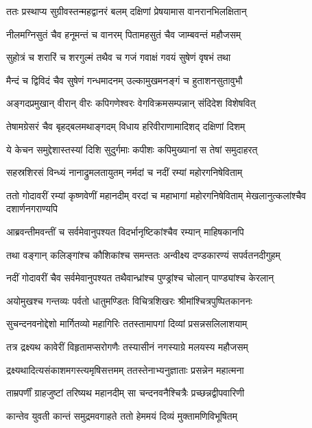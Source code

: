 
\twolineshloka
{ततः प्रस्थाप्य सुग्रीवस्तन्महद्वानरं बलम्}
{दक्षिणां प्रेषयामास वानरानभिलक्षितान्} %

\twolineshloka
{नीलमग्निसुतं चैव हनूमन्तं च वानरम्}
{पितामहसुतं चैव जाम्बवन्तं महौजसम्} %

\twolineshloka
{सुहोत्रं च शरारिं च शरगुल्मं तथैव च}
{गजं गवाक्षं गवयं सुषेणं वृषभं तथा} %

\twolineshloka
{मैन्दं च द्विविदं चैव सुषेणं गन्धमादनम्}
{उल्कामुखमनङ्गं च हुताशनसुतावुभौ} %

\twolineshloka
{अङ्गदप्रमुखान् वीरान् वीरः कपिगणेश्वरः}
{वेगविक्रमसम्पन्नान् संदिदेश विशेषवित्} %

\twolineshloka
{तेषामग्रेसरं चैव बृहद्बलमथाङ्गदम्}
{विधाय हरिवीराणामादिशद् दक्षिणां दिशम्} %

\twolineshloka
{ये केचन समुद्देशास्तस्यां दिशि सुदुर्गमाः}
{कपीशः कपिमुख्यानां स तेषां समुदाहरत्} %

\twolineshloka
{सहस्रशिरसं विन्ध्यं नानाद्रुमलतायुतम्}
{नर्मदां च नदीं रम्यां महोरगनिषेविताम्} %

\threelineshloka
{ततो गोदावरीं रम्यां कृष्णवेणीं महानदीम्}
{वरदां च महाभागां महोरगनिषेविताम्}
{मेखलानुत्कलांश्चैव दशार्णनगराण्यपि} %

\twolineshloka
{आब्रवन्तीमवन्तीं च सर्वमेवानुपश्यत}
{विदर्भानृष्टिकांश्चैव रम्यान् माहिषकानपि} %

\twolineshloka
{तथा वङ्गान् कलिङ्गांश्च कौशिकांश्च समन्ततः}
{अन्वीक्ष्य दण्डकारण्यं सपर्वतनदीगुहम्} %

\twolineshloka
{नदीं गोदावरीं चैव सर्वमेवानुपश्यत}
{तथैवान्ध्रांश्च पुण्ड्रांश्च चोलान् पाण्ड्यांश्च केरलान्} %

\twolineshloka
{अयोमुखश्च गन्तव्यः पर्वतो धातुमण्डितः}
{विचित्रशिखरः श्रीमांश्चित्रपुष्पितकाननः} %

\twolineshloka
{सुचन्दनवनोद्देशो मार्गितव्यो महागिरिः}
{ततस्तामापगां दिव्यां प्रसन्नसलिलाशयाम्} %

\twolineshloka
{तत्र द्रक्ष्यथ कावेरीं विहृतामप्सरोगणैः}
{तस्यासीनं नगस्याग्रे मलयस्य महौजसम्} %

\twolineshloka
{द्रक्ष्यथादित्यसंकाशमगस्त्यमृषिसत्तमम्}
{ततस्तेनाभ्यनुज्ञाताः प्रसन्नेन महात्मना} %

\twolineshloka
{ताम्रपर्णीं ग्राहजुष्टां तरिष्यथ महानदीम्}
{सा चन्दनवनैश्चित्रैः प्रच्छन्नद्वीपवारिणी} %

\twolineshloka
{कान्तेव युवती कान्तं समुद्रमवगाहते}
{ततो हेममयं दिव्यं मुक्तामणिविभूषितम्} %

